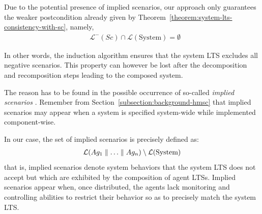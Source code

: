 Due to the potential presence of implied scenarios, our approach only guarantees the weaker postcondition already given by Theorem~\ref{theorem:system-lts-consistency-with-sc}, namely,
\begin{align*}
&\mathcal{L}^-(Sc) \cap \mathcal{L}(\mbox{System}) = \emptyset
\end{align*}

In other words, the induction algorithm ensures that the system LTS excludes all negative scenarios. This property can however be lost after the decomposition and recomposition steps leading to the composed system.

The reason has to be found in the possible occurrence of so-called \emph{implied scenarios} \cite{Alur:2000, Uchitel:2004}. Remember from Section~\ref{subsection:background-hmsc} that implied scenarios may appear when a system is specified system-wide while implemented component-wise. 

In our case, the set of implied scenarios is precisely defined as:
\begin{align}
\mathcal{L}(Ag_1 \parallel \ldots \parallel Ag_n) \setminus \mathcal{L}(\mbox{System})\label{proof:set-of-implied-scenarios}
\end{align}
that is, implied scenarios denote system behaviors that the system LTS does not accept but which are exhibited by the composition of agent LTSs. Implied scenarios appear when, once distributed, the agents lack monitoring and controlling abilities to restrict their behavior so as to precisely match the system LTS.

